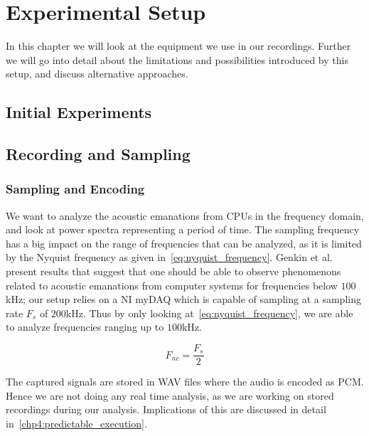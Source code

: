 \chapter{Experimental Setup}
In this chapter we will look at the equipment we use in our recordings.
Further we will go into detail about the limitations and possibilities introduced by this setup, and discuss alternative approaches.

\label{chp:experimental_setup} 

\section{Initial Experiments}


\section{Recording and Sampling}\label{chp3:sec:microphone_selection}

\subsection{Sampling and Encoding}
We want to analyze the acoustic emanations from CPUs in the frequency domain, and look at power spectra representing a period of time.
The sampling frequency has a big impact on the range of frequencies that can be analyzed, as it is limited by the Nyquist frequency as given in~\autoref{eq:nyquist_frequency}.
Genkin et al. present results that suggest that one should be able to observe phenomenons related to acoustic emanations from computer systems for frequencies below \(100\)kHz; our setup relies on a \gls{NI} myDAQ which is capable of sampling at a sampling rate \({F_{s}}\) of \(200\)kHz.\footnotemark
Thus by only looking at~\autoref{eq:nyquist_frequency}, we are able to analyze frequencies ranging up to \(100\)kHz.



\begin{equation}\label{eq:nyquist_frequency}
F_{nc} = \frac{F_{s}}{2}
\end{equation}

The captured signals are stored in WAV files where the audio is encoded as \gls{PCM}.
Hence we are not doing any real time analysis, as we are working on stored recordings during our analysis.
Implications of this are discussed in detail in~\autoref{chp4:predictable_execution}.


